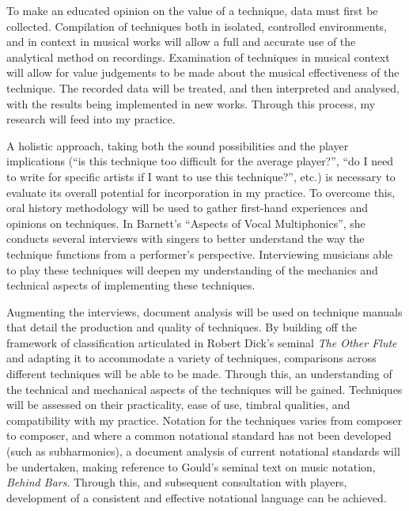 To make an educated opinion on the value of a technique, data must first be collected. 
Compilation of techniques both in isolated, controlled environments, and in context in musical works will allow a full and accurate use of the analytical method on recordings. 
Examination of techniques in musical context will allow for value judgements to be made about the musical effectiveness of the technique. 
The recorded data will be treated, and then interpreted and analysed, with the results being implemented in new works.\autocite{torresMultiphonicsCompositionalElement2012} 
Through this process, my research will feed into my practice.


A holistic approach, taking both the sound possibilities and the player implications (“is this technique too difficult for the average player?”, “do I need to write for specific artists if I want to use this technique?”, etc.) is necessary to evaluate its overall potential for incorporation in my practice. 
To overcome this, oral history methodology will be used to gather first-hand experiences and opinions on techniques. 
In Barnett’s ``Aspects of Vocal Multiphonics'', she conducts several interviews with singers to better understand the way the technique functions from a performer’s perspective.\autocite{barnettAspectsVocalMultiphonics1977} 
Interviewing musicians able to play these techniques will deepen my understanding of the mechanics and technical aspects of implementing these techniques. 

Augmenting the interviews, document analysis will be used on technique manuals that detail the production and quality of techniques. 
By building off the framework of classification articulated in Robert Dick’s seminal \emph{The Other Flute} and adapting it to accommodate a variety of techniques, comparisons across different techniques will be able to be made.\autocite{dickOtherFlute1989} 
Through this, an understanding of the technical and mechanical aspects of the techniques will be gained. 
Techniques will be assessed on their practicality, ease of use, timbral qualities, and compatibility with my practice. 
Notation for the techniques varies from composer to composer, and where a common notational standard has not been developed (such as subharmonics), a document analysis of current notational standards will be undertaken, making reference to Gould’s seminal text on music notation, \emph{Behind Bars}.\autocite{gouldBars2011} 
Through this, and subsequent consultation with players, development of a consistent and effective notational language can be achieved.

